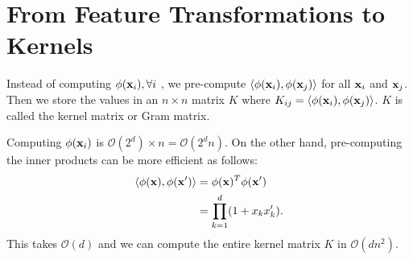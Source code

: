 





\section{From Feature Transformations to Kernels}
\label{sec:kernel:kernels}
Instead of computing $\phi({\mathbf{x}}_i), \forall i$ , we pre-compute $\langle \phi({\mathbf{x}}_i), \phi({\mathbf{x}}_j)\rangle$ for all ${\mathbf{x}}_i$ and ${\mathbf{x}}_j$. Then we store the values in an $n\times n$ matrix $K$ where $K_{ij}= \langle \phi({\mathbf{x}}_i), \phi({\mathbf{x}}_j)\rangle$. $K$ is called the kernel matrix or Gram matrix. 

Computing $\phi({\mathbf{x}}_i)$ is $\mathcal{O}(2^d)\times n = \mathcal{O}(2^dn)$. On the other hand, pre-computing the inner products can be more efficient as follows:
\begin{align*}
	\langle \phi({\mathbf{x}}), \phi({\mathbf{x}}')\rangle &= \phi({\mathbf{x}})^T\phi({\mathbf{x}}')\\ 
										   &= \prod_{k=1}^d(1+x_kx'_k).
\end{align*}
This takes $\mathcal{O}(d)$ and we can compute the entire kernel matrix $K$ in $\mathcal{O}(dn^2)$. 

